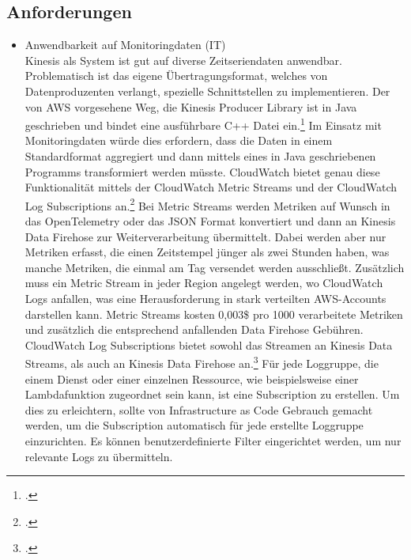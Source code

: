 \subsection{Anforderungen}
\begin{itemize}
\item Anwendbarkeit auf Monitoringdaten (IT)\\
Kinesis als System ist gut auf diverse Zeitseriendaten anwendbar. Problematisch ist das eigene Übertragungsformat, welches von Datenproduzenten verlangt, spezielle Schnittstellen zu implementieren. Der von \ac{AWS} vorgesehene Weg, die Kinesis Producer Library ist in Java geschrieben und bindet eine ausführbare C++ Datei ein.\footcite[Vgl.][]{AmazonWebServicesInc..o.J.bg} Im Einsatz mit Monitoringdaten würde dies erfordern, dass die Daten in einem Standardformat aggregiert und dann mittels eines in Java geschriebenen Programms transformiert werden müsste. 
CloudWatch bietet genau diese Funktionalität mittels der CloudWatch Metric Streams und der CloudWatch Log Subscriptions an.\footcite[Vgl. auch im Folgenden][]{Barr.2021} Bei Metric Streams werden Metriken auf Wunsch in das OpenTelemetry oder das \ac{JSON} Format konvertiert und dann an Kinesis Data Firehose zur Weiterverarbeitung übermittelt. Dabei werden aber nur Metriken erfasst, die einen Zeitstempel jünger als zwei Stunden haben, was manche Metriken, die einmal am Tag versendet werden ausschließt. Zusätzlich muss ein Metric Stream in jeder Region angelegt werden, wo CloudWatch Logs anfallen, was eine Herausforderung in stark verteilten \ac{AWS}-Accounts darstellen kann. Metric Streams kosten 0,003\$ pro 1000 verarbeitete Metriken und zusätzlich die entsprechend anfallenden Data Firehose Gebühren. CloudWatch Log Subscriptions bietet sowohl das Streamen an Kinesis Data Streams, als auch an Kinesis Data Firehose an.\footcite[Vgl. auch im Folgenden][]{AmazonWebServicesInc..o.J.bk} Für jede Loggruppe, die einem Dienst oder einer einzelnen Ressource, wie beispielsweise einer Lambdafunktion zugeordnet sein kann, ist eine Subscription zu erstellen. Um dies zu erleichtern, sollte von Infrastructure as Code Gebrauch gemacht werden, um die Subscription automatisch für jede erstellte Loggruppe einzurichten. Es können benutzerdefinierte Filter eingerichtet werden, um nur relevante Logs zu übermitteln.


\end{itemize}
